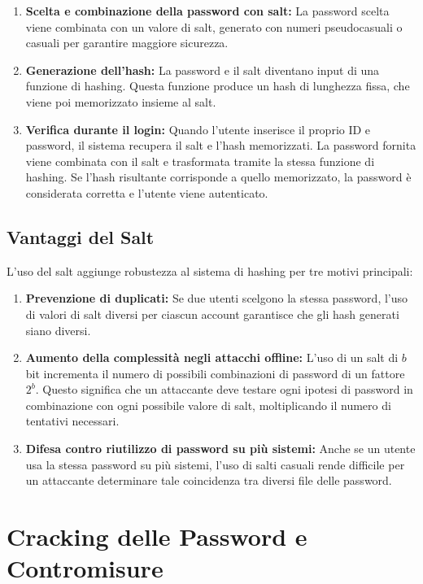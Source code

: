 \begin{enumerate}
    \item \textbf{Scelta e combinazione della password con salt:} La password scelta viene combinata con un valore di salt, generato con numeri pseudocasuali o casuali per garantire maggiore sicurezza.
    \item \textbf{Generazione dell'hash:} La password e il salt diventano input di una funzione di hashing. Questa funzione produce un hash di lunghezza fissa, che viene poi memorizzato insieme al salt.
    \item \textbf{Verifica durante il login:} Quando l'utente inserisce il proprio ID e password, il sistema recupera il salt e l'hash memorizzati. La password fornita viene combinata con il salt e trasformata tramite la stessa funzione di hashing. Se l'hash risultante corrisponde a quello memorizzato, la password è considerata corretta e l'utente viene autenticato.
\end{enumerate}

\subsection{Vantaggi del Salt}

L'uso del salt aggiunge robustezza al sistema di hashing per tre motivi principali:

\begin{enumerate}
    \item \textbf{Prevenzione di duplicati:} Se due utenti scelgono la stessa password, l'uso di valori di salt diversi per ciascun account garantisce che gli hash generati siano diversi.
    
    \item \textbf{Aumento della complessità negli attacchi offline:} L'uso di un salt di $b$ bit incrementa il numero di possibili combinazioni di password di un fattore $2^b$. Questo significa che un attaccante deve testare ogni ipotesi di password in combinazione con ogni possibile valore di salt, moltiplicando il numero di tentativi necessari.
    
    \item \textbf{Difesa contro riutilizzo di password su più sistemi:} Anche se un utente usa la stessa password su più sistemi, l'uso di salti casuali rende difficile per un attaccante determinare tale coincidenza tra diversi file delle password.
\end{enumerate}

\section{Cracking delle Password e Contromisure}

